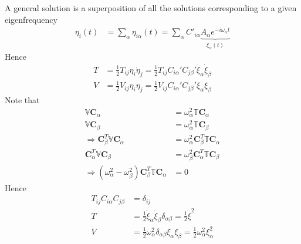 \documentclass[twoside,9pt]{article}
\numberwithin{equation}{section} %
\theoremstyle{definition}
\theoremstyle{remark}
\begin{document}
A general solution is a superposition of all the solutions corresponding to
a given eigenfrequency
\begin{align}
    \eta_i(t) &= \sum_\alpha\eta_{i\alpha}(t)
    = \sum_\alpha  C'_{i\alpha}
    \underbrace{A_\alpha e^{-i\omega_\alpha t}}_{\xi_\alpha(t)}
\end{align}
Hence
\begin{align}
    T &= \frac{1}{2}T_{ij}\dot\eta_i\dot\eta_j 
    = \frac{1}{2}T_{ij}C_{i\alpha}'C_{j\beta}'\dot\xi_\alpha\dot\xi_\beta\\
    V &= \frac{1}{2}V_{ij}\eta_i\eta_j = \frac{1}{2}V_{ij}C_{i\alpha}'C_{j\beta}'
    \xi_\alpha\xi_\beta
\end{align}
Note that 
\begin{align}
    \mathbb V\mathbf{C}_\alpha &= \omega_\alpha^2\mathbb T\mathbf{C}_\alpha\\
    \mathbb V\mathbf{C}_\beta &= \omega_\alpha^2\mathbb T\mathbf{C}_\beta\\
    \Rightarrow
    \mathbf C_\beta^T\mathbb V\mathbf C_\alpha &= 
    \omega_\alpha^2\mathbf C_\beta^T \mathbb{T}\mathbf C_\alpha\\
    \mathbf C_\alpha^T\mathbb V\mathbf C_\beta &= 
    \omega_\beta^2\mathbf C_\alpha^T \mathbb{T}\mathbf C_\beta\\
    \Rightarrow
    (\omega_\alpha^2 - \omega_\beta^2)\mathbf C_\beta^T\mathbb T\mathbf C_\alpha &= 0
\end{align}
Hence
\begin{align}
    T_{ij}C_{i\alpha}C_{j\beta} &= \delta_{ij}\\
    T &= \frac{1}{2}\dot\xi_\alpha\dot\xi_\beta\delta_{\alpha\beta}
    = \frac{1}{2}\dot\xi^2\\
    V &= \frac{1}{2}\omega_\alpha^2\delta_{\alpha\beta}\xi_\alpha\xi_\beta
    = \frac{1}{2}\omega_\alpha^2\xi_\alpha^2
\end{align}



\end{document}
